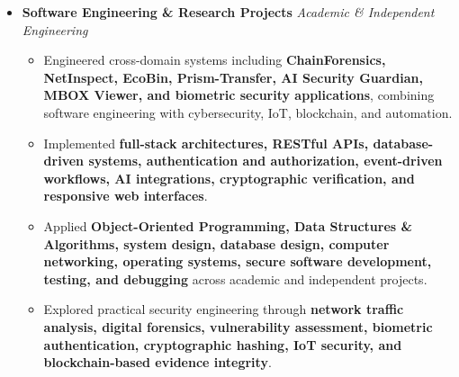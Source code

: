 \documentclass[a4paper,11pt]{article}
\newcommand{\resumeItem}[1]{
\item \small{#1 \vspace{-2pt}}
}
\begin{document}
\begin{itemize}[leftmargin=0in, label={}]
\begin{itemize}[leftmargin=*]
\resumeItem{Build across the complete software lifecycle, including \textbf{system architecture, database design, API development, authentication, security engineering, testing, debugging, deployment, performance optimization, and technical documentation}.}

\resumeItem{Maintain an engineering portfolio spanning \textbf{digital forensics, network security, IoT security, blockchain evidence preservation, AI security automation, computer vision, conversational commerce, and enterprise software}.}

\end{itemize}

\vspace{4pt}

\item
\textbf{Software Engineering \& Research Projects}
\hfill \textit{Academic \& Independent Engineering}

\begin{itemize}[leftmargin=*]

\resumeItem{Engineered cross-domain systems including \textbf{ChainForensics, NetInspect, EcoBin, Prism-Transfer, AI Security Guardian, MBOX Viewer, and biometric security applications}, combining software engineering with cybersecurity, IoT, blockchain, and automation.}

\resumeItem{Implemented \textbf{full-stack architectures, RESTful APIs, database-driven systems, authentication and authorization, event-driven workflows, AI integrations, cryptographic verification, and responsive web interfaces}.}

\resumeItem{Applied \textbf{Object-Oriented Programming, Data Structures \& Algorithms, system design, database design, computer networking, operating systems, secure software development, testing, and debugging} across academic and independent projects.}

\resumeItem{Explored practical security engineering through \textbf{network traffic analysis, digital forensics, vulnerability assessment, biometric authentication, cryptographic hashing, IoT security, and blockchain-based evidence integrity}.}

\end{itemize}

\end{itemize}

\vspace{-10pt}
\end{document}
